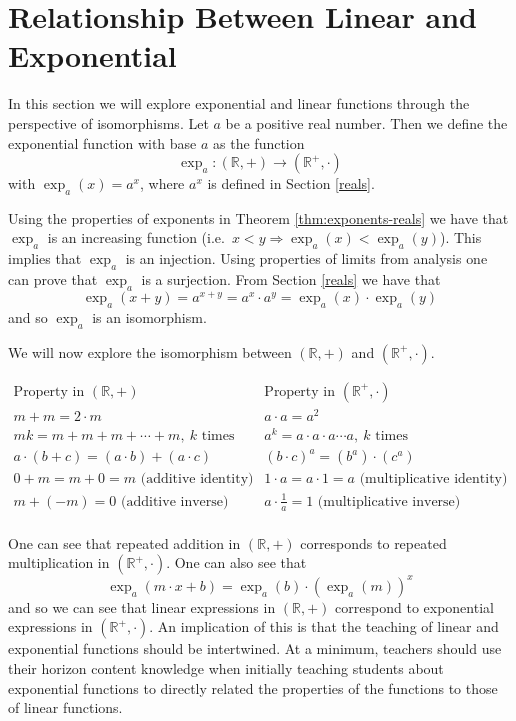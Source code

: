 \documentclass[
]{book}
\let\stdsection\section
\renewcommand\section{\newpage\stdsection}
\theoremstyle{definition}
\theoremstyle{definition}
\theoremstyle{definition}
\theoremstyle{definition}
\theoremstyle{remark}
\begin{document}
\hypertarget{linear-exponential}{%
\section{Relationship Between Linear and Exponential}\label{linear-exponential}}

In this section we will explore exponential and linear functions through the perspective of isomorphisms. Let \(a\) be a positive real number. Then we define the exponential function with base \(a\) as the function \[\exp_a: (\mathbb{R},+) \rightarrow (\mathbb{R}^+,\cdot)\] with \(\exp_a{(x)}= a^x\), where \(a^x\) is defined in Section \ref{reals}.

Using the properties of exponents in Theorem \ref{thm:exponents-reals} we have that \(\exp_a\) is an increasing function (i.e.~\(x<y \Rightarrow \exp_a{(x)}<\exp_a{(y)}\)). This implies that \(\exp_a\) is an injection. Using properties of limits from analysis one can prove that \(\exp_a\) is a surjection. From Section \ref{reals} we have that \[\exp_a{(x+y)} = a^{x+y} = a^x \cdot a^y = \exp_a{(x)}\cdot \exp_a{(y)}\] and so \(\exp_a\) is an isomorphism.

We will now explore the isomorphism between \((\mathbb{R},+)\) and \((\mathbb{R}^+,\cdot)\).

\[\begin{array}{c|c}
\mbox{Property in } (\mathbb{R},+) & \mbox{Property in } (\mathbb{R}^+,\cdot) \\ \hline
 m+m=2\cdot m & a\cdot a = a^2 \\ 
mk=m+m+m+\cdots +m, \: k \mbox{ times} & a^k=a \cdot a \cdot a\cdots a, \: k \mbox{ times} \\ 
a\cdot (b+c) = (a\cdot b) + (a\cdot c) & (b\cdot c)^a = (b^a) \cdot (c^a) \\ 
0+m=m+0=m  \mbox{ (additive identity)} & 1\cdot a=a\cdot 1= a  \mbox{ (multiplicative identity)} \\ 
m+(-m)=0 \mbox{ (additive inverse)} & a\cdot \frac{1}{a}=1 \mbox{ (multiplicative inverse)} \\ 
\end{array}\]

One can see that repeated addition in \((\mathbb{R},+)\) corresponds to repeated multiplication in \((\mathbb{R}^+,\cdot)\). One can also see that \[\exp_a\left( m\cdot x + b\right) = \exp_a(b) \cdot \left(\exp_a(m)\right)^x\] and so we can see that linear expressions in \((\mathbb{R},+)\) correspond to exponential expressions in \((\mathbb{R}^+,\cdot)\). An implication of this is that the teaching of linear and exponential functions should be intertwined. At a minimum, teachers should use their horizon content knowledge when initially teaching students about exponential functions to directly related the properties of the functions to those of linear functions.
\end{document}

